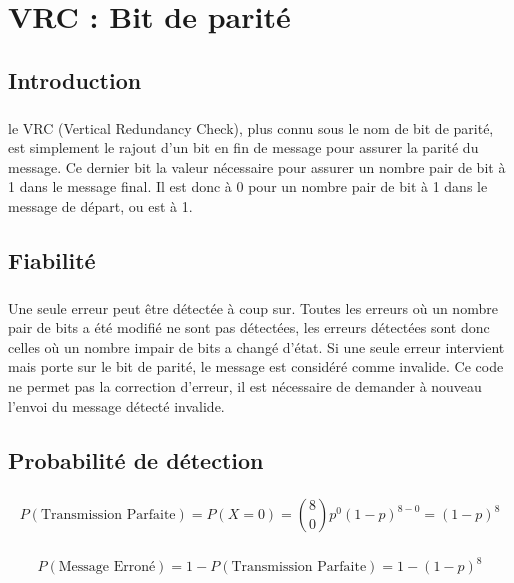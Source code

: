 
\chapter{VRC : Bit de parité}

    \section{Introduction}

        \paragraph{}
le VRC (Vertical Redundancy Check), plus connu sous le nom de bit de parité,
est simplement le rajout d'un bit en fin de message pour assurer la parité du message.
Ce dernier bit la valeur nécessaire pour assurer un nombre pair de bit à 1 dans le message final.
Il est donc à 0 pour un nombre pair de bit à 1 dans le message de départ, ou est à 1.


    \section{Fiabilité}

        \paragraph{}
Une seule erreur peut être détectée à coup sur.
Toutes les erreurs où un nombre pair de bits a été modifié ne sont pas détectées,
les erreurs détectées sont donc celles où un nombre impair de bits a changé d'état.
Si une seule erreur intervient mais porte sur le bit de parité, le message est considéré comme invalide.
Ce code ne permet pas la correction d'erreur, il est nécessaire de demander à nouveau l'envoi du message détecté invalide.


    \section{Probabilité de détection}

        \paragraph{}
\[  P(\text{Transmission Parfaite}) = P(X=0) = {8\choose 0}p^0(1-p)^{8-0} = (1-p)^8 \]
        \paragraph{}
\[  P(\text{Message Erroné}) = 1 - P(\text{Transmission Parfaite}) = 1 - (1-p)^8 \]
